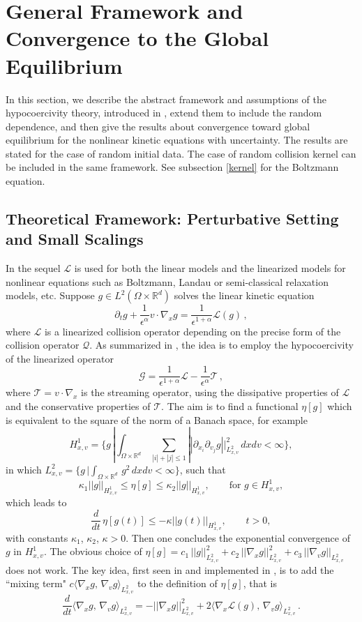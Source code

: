 \documentclass[final,onefignum,onetabnum]{siamart171218}
\newcounter{example}
\begin{document}
\section{General Framework and Convergence to the Global Equilibrium}
\label{Section1}

In this section, we describe the abstract framework and assumptions of the hypocoercivity theory, introduced in \cite{CN, MB}, extend them to include the
random dependence, and then give the results about
convergence toward global equilibrium for the nonlinear kinetic equations
with uncertainty.
The results are stated for the case of random initial data. The case of random collision kernel can be included
in the same framework. See subsection \ref{kernel} for the Boltzmann equation.

\subsection{Theoretical Framework: Perturbative Setting and Small Scalings}
In the sequel $\mathcal L$ is used for both the linear models and the linearized models for nonlinear equations such as Boltzmann, Landau or semi-classical relaxation models, etc.
Suppose $g\in L^2(\Omega\times{\mathbb R^d})$ solves the linear kinetic equation
\begin{equation}\label{linear}\partial_t g + \frac{1}{\epsilon^\alpha} v\cdot\nabla_x g=\frac{1}{\epsilon^{1+\alpha}} \mathcal L(g)\,, \end{equation}
where $\mathcal L$ is a linearized collision operator depending on the precise form of the collision operator $\mathcal Q$.
As summarized in \cite{MM}, the idea is to employ the hypocoercivity of the linearized operator
\[\mathcal G=\frac{1}{\epsilon^{1+\alpha}}\mathcal L-\frac{1}{\epsilon^{\alpha}}
  \mathcal T\,,
\]
where
$\mathcal T=v\cdot\nabla_x$  is the streaming operator, using the dissipative properties of $\mathcal L$ and the conservative properties of $\mathcal T$.
The aim is to find a functional $\eta [g]$ which is equivalent to the square of the norm of a Banach space,
for example
\[H_{x,v}^1=\{g\, |\int_{\Omega\times\mathbb R^d}\, \sum_{|i|+|j|\leq 1} ||\partial_{x_i} \partial_{v_j} g ||_{L^2_{x,v}}^2\, dxdv<\infty
  \}, 
\]
in which $L_{x,v}^2 = \{ g\, | \int_{\Omega\times\mathbb R^d} \, g^2 \, dxdv < \infty\}$, such that $$\kappa_1 ||g||_{H_{x,v}^1} \leq \eta[g] \leq \kappa_2 ||g||_{H_{x,v}^1}, \qquad \text{for  } g\in H_{x,v}^1, $$
which leads to $$\frac{d}{dt}\, \eta[g(t)] \leq -\kappa ||g(t)||_{H_{x,v}^1}, \qquad t>0, $$
with constants $\kappa_1$, $\kappa_2$, $\kappa>0$. Then one concludes the exponential convergence of $g$ in $H^1_{x,v}$.
The obvious choice of $\eta[g]= c_1\, ||g||_{L^2_{x,v}}^2 + c_2\, ||\nabla_x g||_{L^2_{x,v}}^2 + c_3\, ||\nabla_v g||_{L^2_{x,v}}$ does not work.
The key idea, first seen in \cite{Villani} and implemented in \cite{CN}, is to add the ``mixing term"
$c\langle\nabla_x g, \, \nabla_v g\rangle_{L^2_{x,v}}$ to the definition of $\eta[g]$, that is
$$\frac{d}{dt}\langle\nabla_x g, \, \nabla_v g\rangle_{L^2_{x,v}} =
-||\nabla_x g||_{L^2_{x,v}}^2 + 2\langle\nabla_x\mathcal L(g), \, \nabla_v g\rangle_{L^2_{x,v}}\,.$$
\end{document}
